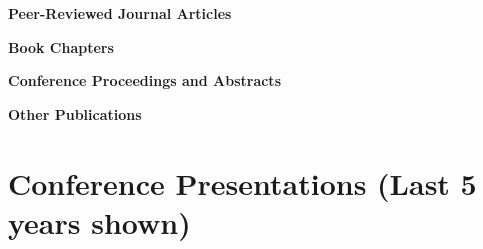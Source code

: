 \documentclass[11pt,a4paper,roman]{moderncv}
\let\oldsection\section
\renewcommand{\section}[1]{\needspace{4\baselineskip}\oldsection{#1}}
\begin{document}
\nocite{*}

\vspace{0.3cm}
\noindent\textbf{Peer-Reviewed Journal Articles}
\printbibliography[heading=none,type=article]

\vspace{0.3cm}
\noindent\textbf{Book Chapters}
\printbibliography[heading=none,type=incollection]

\vspace{0.3cm}
\noindent\textbf{Conference Proceedings and Abstracts}
\printbibliography[heading=none,type=inproceedings]

\vspace{0.3cm}
\noindent\textbf{Other Publications}
\printbibliography[heading=none,type=misc]

\section{Conference Presentations (Last 5 years shown)}
\end{document}
